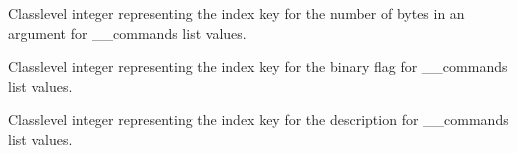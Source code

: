 \documentclass[letterpaper,10pt,english]{sphinxmanual}
\begin{document}
\begin{fulllineitems}

\begin{fulllineitems}
\label{\detokenize{Morelia.Commands:Morelia.Commands.PodCommands.CommandSet.__ARGUMENTS}}
\pysigstartsignatures
{}
\pysigstopsignatures
\sphinxAtStartPar
Class\sphinxhyphen{}level integer representing the index key for the number of bytes in an     argument for \_\_commands list values.

\end{fulllineitems}


\begin{fulllineitems}
\label{\detokenize{Morelia.Commands:Morelia.Commands.PodCommands.CommandSet.__BINARY}}
\pysigstartsignatures
{}
\pysigstopsignatures
\sphinxAtStartPar
Class\sphinxhyphen{}level integer representing the index key for the binary flag for \_\_commands     list values.

\end{fulllineitems}


\begin{fulllineitems}
\label{\detokenize{Morelia.Commands:Morelia.Commands.PodCommands.CommandSet.__DESCRIPTION}}
\pysigstartsignatures
{}
\pysigstopsignatures
\sphinxAtStartPar
Class\sphinxhyphen{}level integer representing the index key for the description for \_\_commands     list values.

\end{fulllineitems}


\end{fulllineitems}
\end{document}
